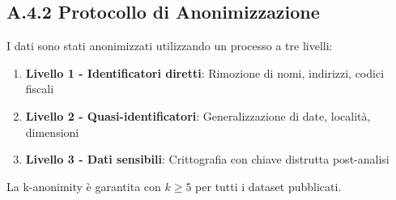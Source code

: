 \subsection{\texorpdfstring{\textbf{A.4.2 Protocollo di Anonimizzazione}}{A.4.2 - Protocollo di Anonimizzazione}}

I dati sono stati anonimizzati utilizzando un processo a tre livelli:

\begin{enumerate}
    \item \textbf{Livello 1 - Identificatori diretti}: Rimozione di nomi, indirizzi, codici fiscali
    \item \textbf{Livello 2 - Quasi-identificatori}: Generalizzazione di date, località, dimensioni
    \item \textbf{Livello 3 - Dati sensibili}: Crittografia con chiave distrutta post-analisi
\end{enumerate}

La k-anonimity è garantita con $k \geq 5$ per tutti i dataset pubblicati.




%